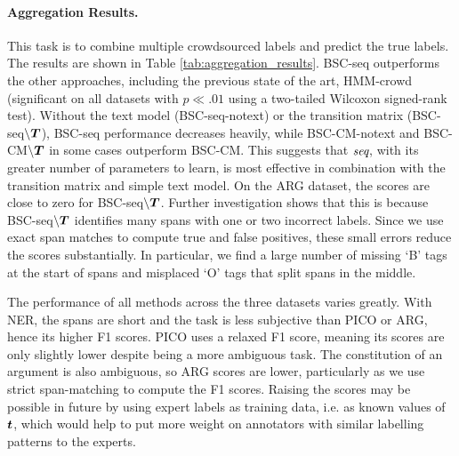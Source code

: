 \paragraph{Aggregation Results. }\label{sec:task1}

This task is to combine multiple crowdsourced labels and predict the true labels.
The results are shown in Table \ref{tab:aggregation_results}.
BSC-seq outperforms the other approaches,
including the previous state of the art, HMM-crowd (significant on all datasets
 with $p\ll.01$ using a two-tailed Wilcoxon signed-rank test).
Without the text model (BSC-seq-notext) or the transition matrix (BSC-seq$\backslash\boldsymbol T$),
BSC-seq performance decreases heavily,
while BSC-CM-notext and BSC-CM$\backslash\boldsymbol T$ in some cases outperform
BSC-CM.
This suggests that $\emph{seq}$, with its greater number of parameters to learn, 
is most effective in combination with the transition matrix and simple text model.
On the ARG dataset, the scores are close to zero for BSC-seq$\backslash\boldsymbol T$.
Further investigation shows that this is because 
BSC-seq$\backslash\boldsymbol T$ identifies many spans with one 
or two incorrect labels. Since we use exact span matches to compute true
and false positives, these small errors reduce the scores substantially.
In particular, we find a large number of missing ‘B’ tags at the start of spans
and misplaced ‘O’ tags that split spans in the middle.

The performance of all methods across the three datasets varies greatly.
With NER, the spans are short and the task is less subjective than PICO or ARG,
hence its higher F1 scores. PICO uses a relaxed F1 score, meaning its scores are
only slightly lower despite being a more ambiguous task. The constitution of an 
argument is also ambiguous, so ARG scores are lower, particularly as we use  
strict span-matching to compute the F1 scores. Raising the scores may be possible in future
by using expert labels as training data, i.e. as known values of $\boldsymbol t$,
which would help to put more weight on annotators with similar labelling 
patterns to the experts.

